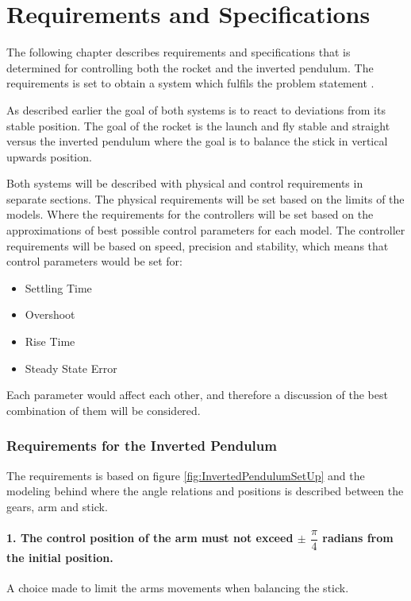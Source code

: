 \chapter{Requirements and Specifications}
The following chapter describes requirements and specifications that is determined for controlling both the rocket and the inverted pendulum. The requirements is set to obtain a system which fulfils the problem statement .

As described earlier the goal of both systems is to react to deviations from its stable position. The goal of the rocket is the launch and fly stable and straight versus the inverted pendulum where the goal is to balance the stick in vertical upwards position.  

Both systems will be described with physical and control requirements in separate sections. The physical requirements will be set based on the limits of the models. Where the requirements for the controllers will be set based on the approximations of best possible control parameters for each model.  
The controller requirements will be based on speed, precision and stability, which means that control parameters would be set for:

\begin{itemize}[noitemsep]
\item Settling Time
\item Overshoot
\item Rise Time
\item Steady State Error
\end{itemize}

Each parameter would affect each other, and therefore a discussion of the best combination of them will be considered.
\newpage
\subsection{Requirements for the Inverted Pendulum}
The requirements is based on figure \ref{fig:InvertedPendulumSetUp} and the modeling behind where the angle relations and positions is described between the gears, arm and stick. 

\setlength{\parindent}{0pt}
\newcommand{\forceindent}{\leavevmode{\parindent=1em\indent}}

\subsubsection*{1. The control position of the arm must not exceed $\pm$ $\dfrac{\pi}{4}$ radians from the initial position.} 
\forceindent A choice made to limit the arms movements when balancing the stick.


